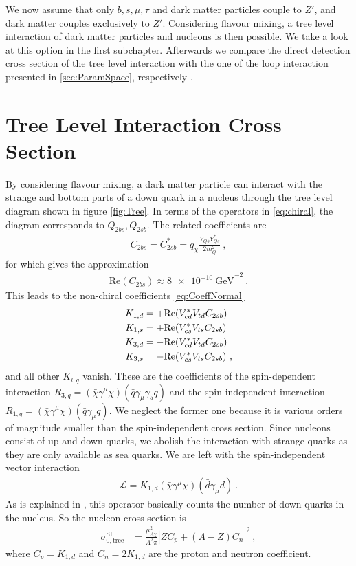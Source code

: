 We now assume that only $b,s,\mu,\tau$ and dark matter particles couple to $Z'$, and dark matter couples exclusively to $Z'$. Considering flavour mixing, a tree level interaction of dark matter particles and nucleons is then possible. We take a look at this option in the first subchapter. Afterwards we compare the direct detection cross section of the tree level interaction with the one of the loop interaction presented in \ref{sec:ParamSpace}, respectively \cite{Z}.


\section{Tree Level Interaction Cross Section}
By considering flavour mixing, a dark matter particle can interact with the strange and bottom parts of a down quark in a nucleus through the tree level diagram shown in figure \ref{fig:Tree}. In terms of the operators in \eqref{eq:chiral}, the diagram corresponds to $Q_{2bs},Q_{2sb}$. The related coefficients are
\begin{align}
	C_{2bs} = C_{2sb}^* = q_\chi\frac{Y_{Qb}Y_{Qs}^*}{2m_Q^2} \ ,
\end{align}
for which \cite{InColour} gives the approximation
\begin{align}\label{eq:BoundC}
\text{Re}\left(C_{2bs}\right) \approx \SI{8e-10}{\giga\electronvolt}^{-2} \ .
\end{align}
This leads to the non-chiral coefficients \eqref{eq:CoeffNormal}
\begin{align}
	K_{1,d} &= +\text{Re}(V_{cd}^*V_{td}C_{2sb})\notag \\
	K_{1,s} &= +\text{Re}(V_{cs}^*V_{ts}C_{2sb})\notag \\
	K_{3,d} &= -\text{Re}(V_{cd}^*V_{td}C_{2sb})\notag \\
	K_{3,s} &= -\text{Re}(V_{cs}^*V_{ts}C_{2sb}) \ ,
\end{align}
and all other $K_{l,q}$ vanish. These are the coefficients of the spin-dependent interaction $R_{3,q} = (\bar{\chi}\gamma^\mu\chi)(\bar{q}\gamma_\mu\gamma_5 q)$ and the spin-independent interaction $R_{1,q} = (\bar{\chi}\gamma^\mu\chi)(\bar{q}\gamma_\mu q)$. We neglect the former one because it is various orders of magnitude smaller than the spin-independent cross section. Since nucleons consist of up and down quarks, we abolish the interaction with strange quarks as they are only available as sea quarks. We are left with the spin-independent vector interaction
\begin{align}
	\mathcal{L} = K_{1,d}(\bar{\chi}\gamma^\mu\chi)(\bar{d}\gamma_\mu d) \ .
\end{align}
As is explained in \cite[Chapter 7]{Supersymmetric}, this operator basically counts the number of down quarks in the nucleus. So the nucleon cross section is
\begin{align}\label{eq:Tree}
	\sigma_{0,\text{tree}}^\text{SI} &= \frac{\mu_{A\chi}^2}{A^2\pi}\left|ZC_p +(A-Z)C_n\right|^2 \ ,
\end{align}
where $C_p = K_{1,d}$ and $C_n = 2K_{1,d}$ are the proton and neutron coefficient.


